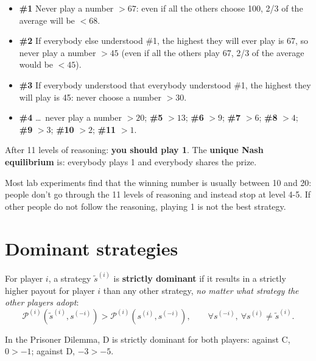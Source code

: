 \documentclass[11pt,a4paper,openany]{book}
\begin{document}
\begin{propbox}[title=Levels of reasoning]
\begin{itemize}
  \item \textbf{\#1} Never play a number $> 67$: even if all the others choose 100, 2/3 of
        the average will be $< 68$.
  \item \textbf{\#2} If everybody else understood \#1, the highest they will ever play is
        67, so never play a number $> 45$ (even if all the others play 67, 2/3 of the
        average would be $< 45$).
  \item \textbf{\#3} If everybody understood that everybody understood \#1, the highest they
        will play is 45: never choose a number $> 30$.
  \item \textbf{\#4} \ldots\ never play a number $> 20$; \textbf{\#5} $> 13$; \textbf{\#6}
        $> 9$; \textbf{\#7} $> 6$; \textbf{\#8} $> 4$; \textbf{\#9} $> 3$; \textbf{\#10}
        $> 2$; \textbf{\#11} $> 1$.
\end{itemize}
After 11 levels of reasoning: \textbf{you should play 1}. The \textbf{unique Nash
equilibrium} is: everybody plays 1 and everybody shares the prize.
\end{propbox}

\begin{warnbox}[title=In the lab]
Most lab experiments find that the winning number is usually between 10 and 20: people don't
go through the 11 levels of reasoning and instead stop at level 4-5. If other people do not
follow the reasoning, playing 1 is not the best strategy.
\end{warnbox}


\section{Dominant strategies}

\begin{defnbox}[title=Strictly dominant strategy]
For player $i$, a strategy $\tilde{s}^{(i)}$ is \textbf{strictly dominant} if it results in
a strictly higher payout for player $i$ than any other strategy, \emph{no matter what
strategy the other players adopt}:
\[
\mathcal{P}^{(i)}(\tilde{s}^{(i)}, s^{(-i)}) > \mathcal{P}^{(i)}(s^{(i)}, s^{(-i)}),
\qquad \forall s^{(-i)}, \ \forall s^{(i)} \ne \tilde{s}^{(i)}.
\]
\end{defnbox}

\begin{exbox}[title=Prisoner Dilemma]
In the Prisoner Dilemma, D is strictly dominant for both players: against C, $0 > -1$;
against D, $-3 > -5$.
\end{exbox}
\end{document}
